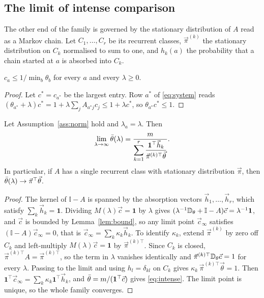 \subsection{The limit of intense comparison}
\label{sec:intense}

The other end of the family is governed by the stationary distribution of $A$
read as a Markov chain. Let $C_1,\dots,C_r$ be its recurrent classes,
$\vec\pi^{(k)}$ the stationary distribution on $C_k$ normalised to sum to one,
and $h_k(a)$ the probability that a chain started at $a$ is absorbed into
$C_k$.

\begin{lemma}
\label{lem:bound}
$c_a\leq1/\min_b\theta_b$ for every $a$ and every $\lambda\geq0$.
\end{lemma}

\begin{proof}
Let $c^{*}=c_{a^{*}}$ be the largest entry. Row $a^{*}$ of \eqref{eq:system}
reads $(\theta_{a^{*}}+\lambda)c^{*}=1+\lambda\sum_jA_{a^{*}j}c_j\leq1+\lambda c^{*}$,
so $\theta_{a^{*}}c^{*}\leq1$.
\end{proof}

\begin{theorem}
\label{thm:intense}
Let Assumption~\ref{ass:norm} hold and $\lambda_a=\lambda$. Then
%
\begin{equation}
\lim_{\lambda\to\infty}\bar\theta(\lambda)
=\frac{m}{\displaystyle\sum_{k=1}^{r}
\frac{\mathbf 1^{\top}\vec h_k}{\vec\pi^{(k)\top}\vec\theta}} .
\label{eq:intense}
\end{equation}
%
In particular, if $A$ has a single recurrent class with stationary distribution
$\vec\pi$, then $\bar\theta(\lambda)\to\vec\pi^{\top}\vec\theta$.
\end{theorem}

\begin{proof}
The kernel of $\mathbb{I}-A$ is spanned by the absorption vectors
$\vec h_1,\dots,\vec h_r$, which satisfy $\sum_k\vec h_k=\mathbf 1$. Dividing
$M(\lambda)\vec c=\mathbf 1$ by $\lambda$ gives
$(\lambda^{-1}\mathbb{D}_{\theta}+\mathbb{I}-A)\vec c=\lambda^{-1}\mathbf 1$, and
$\vec c$ is bounded by Lemma~\ref{lem:bound}, so any limit point $\vec c_\infty$
satisfies $(\mathbb{I}-A)\vec c_\infty=0$, that is
$\vec c_\infty=\sum_k\kappa_k\vec h_k$. To identify $\kappa_k$, extend
$\vec\pi^{(k)}$ by zero off $C_k$ and left-multiply $M(\lambda)\vec c=\mathbf 1$
by $\vec\pi^{(k)\top}$. Since $C_k$ is closed, $\vec\pi^{(k)\top}A=\vec\pi^{(k)\top}$,
so the term in $\lambda$ vanishes identically and
$\vec\pi^{(k)\top}\mathbb{D}_{\theta}\vec c=1$ for every $\lambda$. Passing to the limit
and using $h_l=\delta_{kl}$ on $C_k$ gives
$\kappa_k\,\vec\pi^{(k)\top}\vec\theta=1$. Then
$\mathbf 1^{\top}\vec c_\infty=\sum_k\kappa_k\mathbf 1^{\top}\vec h_k$, and
$\bar\theta=m/(\mathbf 1^{\top}\vec c)$ gives \eqref{eq:intense}. The limit point is
unique, so the whole family converges.
\end{proof}

